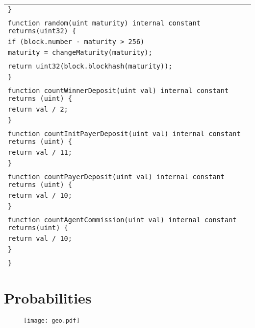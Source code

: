 \documentclass[a4paper]{article}
\begin{document}
\begin{tabularx}{\linewidth}{l}
        \qquad\texttt{\}}\\
        \\
        \qquad\texttt{function random(uint maturity) internal constant returns(uint32) \{}\\
        \qquad\qquad\texttt{if (block.number - maturity > 256)}\\
        \qquad\qquad\qquad\texttt{maturity = changeMaturity(maturity);}\\
        \\
        \qquad\qquad\texttt{return uint32(block.blockhash(maturity));}\\
        \qquad\texttt{\}}\\
        \\
        \qquad\texttt{function countWinnerDeposit(uint val) internal constant returns (uint) \{}\\
        \qquad\qquad\texttt{return val / 2;}\\
        \qquad\texttt{\}}\\
        \\
        \qquad\texttt{function countInitPayerDeposit(uint val) internal constant returns (uint) \{}\\
        \qquad\qquad\texttt{return val / 11;}\\
        \qquad\texttt{\}}\\
        \\
        \qquad\texttt{function countPayerDeposit(uint val) internal constant returns (uint) \{}\\
        \qquad\qquad\texttt{return val / 10;}\\
        \qquad\texttt{\}}\\
        \\
        \qquad\texttt{function countAgentCommission(uint val) internal constant returns(uint) \{}\\
        \qquad\qquad\texttt{return val / 10;}\\
        \qquad\texttt{\}}\\
        \\
        \texttt{\}}\\
    \end{tabularx}

\section{Probabilities}

\begin{figure}
\centering

\texttt{[image: geo.pdf]}
\end{figure}
\end{document}
